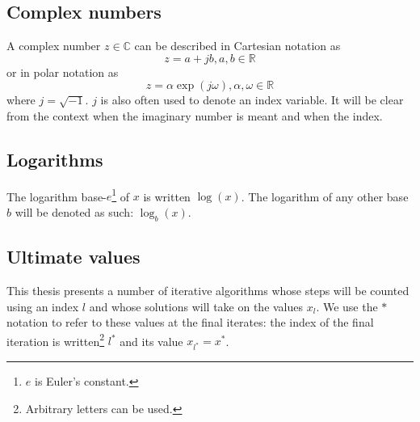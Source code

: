 \subsection{Complex numbers}

A complex number $z \in \mathbb{C}$ can be described in Cartesian notation as
\[
    z = a + jb, a,b \in \mathbb{R}
\]
or in polar notation as
\[
    z = \alpha \exp(j\omega), \alpha,\omega \in \mathbb{R}
\]
where $j = \sqrt{-1}$. $j$ is also often used to denote an index variable. It
will be clear from the context when the imaginary number is meant and when the
index.

\subsection{Logarithms}

The logarithm base-$e$\footnote{$e$ is Euler's constant.} of $x$ is written
$\log(x)$. The logarithm of any other base $b$ will be denoted as such:
$\log_{b}(x)$.

\subsection{Ultimate values}

This thesis presents a number of iterative algorithms whose steps will 
be counted using an index $l$ and whose solutions will take on the values
$x_{l}$. We use the
$\ast$ notation to refer to these values at the final iterates: the index of the
final iteration is written\footnote{Arbitrary letters can be used.} $l^{\ast}$ and its value $x_{l^{\ast}}=x^{\ast}$.
